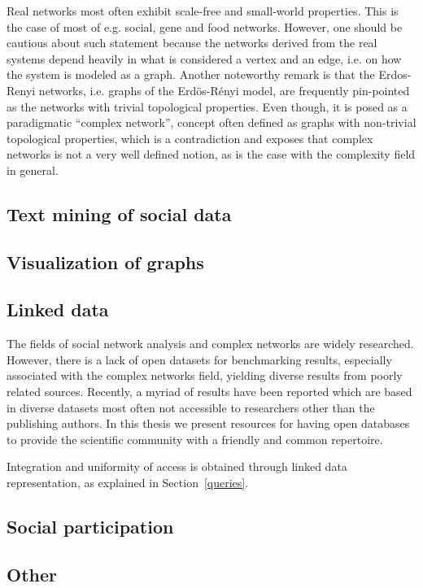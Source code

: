 Real networks most often exhibit scale-free and small-world properties.
This is the case of most of e.g. social, gene and food networks.
However, one should be cautious about such statement because
the networks derived from the real systems depend heavily
in what is considered a vertex and an edge,
i.e. on how the system is modeled as a graph.
Another noteworthy remark is that
the Erdos-Renyi networks, i.e. graphs of the Erdös-Rényi model, are frequently pin-pointed as the networks with trivial
topological properties.
Even though, it is posed as a paradigmatic ``complex network'', concept often defined as graphs with non-trivial topological properties,
which is a contradiction and exposes that complex networks is not a very well defined notion,
as is the case with the complexity field in general.

\subsection{Text mining of social data}

\subsection{Visualization of graphs}
\subsection{Linked data}
The fields of social network analysis and complex networks
are widely researched.
However, there is a lack of open datasets for benchmarking results,
especially associated with the complex networks field,
yielding diverse results from poorly related sources.
Recently, a myriad of results have been reported which are based in
diverse datasets most often not accessible to researchers other than the publishing authors.
In this thesis we present resources for having open databases to provide the scientific community with a friendly and common repertoire.

Integration and uniformity of access is obtained through linked data
representation, as explained in Section~\ref{queries}.

\subsection{Social participation}
\subsection{Other}

